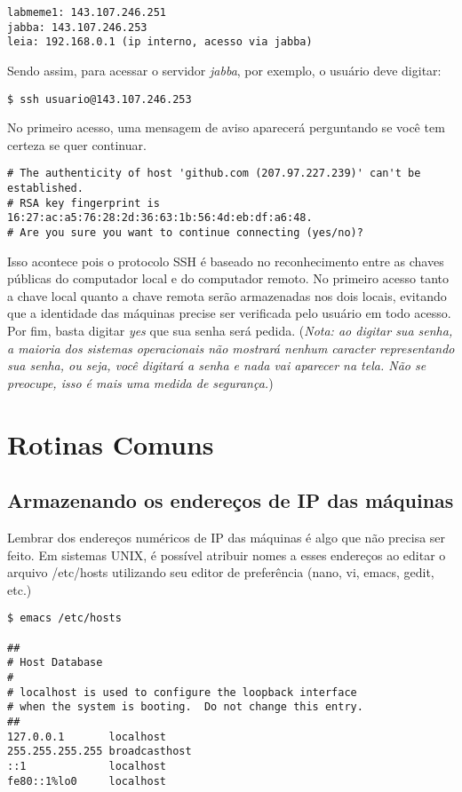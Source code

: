 \documentclass[]{article}
\begin{document}
\begin{verbatim}
labmeme1: 143.107.246.251
jabba: 143.107.246.253
leia: 192.168.0.1 (ip interno, acesso via jabba)
\end{verbatim}

Sendo assim, para acessar o servidor \emph{jabba}, por exemplo, o
usuário deve digitar:

\begin{verbatim}
$ ssh usuario@143.107.246.253
\end{verbatim}

No primeiro acesso, uma mensagem de aviso aparecerá perguntando se você
tem certeza se quer continuar.

\begin{verbatim}
# The authenticity of host 'github.com (207.97.227.239)' can't be established.
# RSA key fingerprint is 16:27:ac:a5:76:28:2d:36:63:1b:56:4d:eb:df:a6:48.
# Are you sure you want to continue connecting (yes/no)?
\end{verbatim}

Isso acontece pois o protocolo SSH é baseado no reconhecimento entre as
chaves públicas do computador local e do computador remoto. No primeiro
acesso tanto a chave local quanto a chave remota serão armazenadas nos
dois locais, evitando que a identidade das máquinas precise ser
verificada pelo usuário em todo acesso. Por fim, basta digitar
\emph{yes} que sua senha será pedida. (\emph{Nota: ao digitar sua senha,
a maioria dos sistemas operacionais não mostrará nenhum caracter
representando sua senha, ou seja, você digitará a senha e nada vai
aparecer na tela. Não se preocupe, isso é mais uma medida de
segurança.})

\section{Rotinas Comuns}\label{rotinas-comuns}

\subsection{Armazenando os endereços de IP das
máquinas}\label{armazenando-os-enderecos-de-ip-das-maquinas}

Lembrar dos endereços numéricos de IP das máquinas é algo que não
precisa ser feito. Em sistemas UNIX, é possível atribuir nomes a esses
endereços ao editar o arquivo /etc/hosts utilizando seu editor de
preferência (nano, vi, emacs, gedit, etc.)

\begin{verbatim}
$ emacs /etc/hosts

##
# Host Database
#
# localhost is used to configure the loopback interface
# when the system is booting.  Do not change this entry.
##
127.0.0.1       localhost
255.255.255.255 broadcasthost
::1             localhost
fe80::1%lo0     localhost
\end{verbatim}
\end{document}
